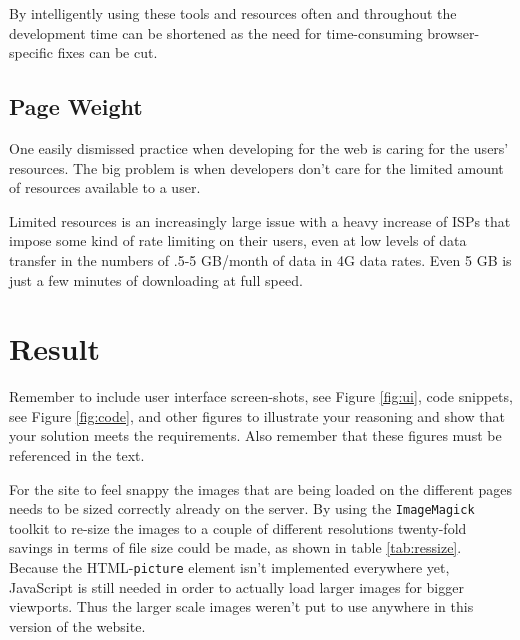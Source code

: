 \documentclass[a4paper]{scrartcl}
\begin{document}
By intelligently using these tools and resources often and throughout the development time can be shortened as the need for time-consuming browser-specific fixes can be cut.

\subsection{Page Weight}
\label{subsec:PageWeight}

One easily dismissed practice when developing for the web is caring for the users' resources. The big problem is when developers don't care for the limited amount of resources available to a user.

Limited resources is an increasingly large issue with a heavy increase of ISPs that impose some kind of rate limiting on their users, even at low levels of data transfer in the numbers of .5-5 GB/month of data in 4G data rates. Even 5 GB is just a few minutes of downloading at full speed.

\section{Result}

Remember to include user interface screen-shots, see Figure \ref{fig:ui}, code snippets, see Figure \ref{fig:code}, and other figures to illustrate your reasoning and show that your solution meets the requirements. Also remember that these figures must be referenced in the text.

For the site to feel snappy the images that are being loaded on the different pages needs to be sized correctly already on the server. By using the \texttt{ImageMagick} toolkit to re-size the images to a couple of different resolutions twenty-fold savings in terms of file size could be made, as shown in table \ref{tab:ressize}. Because the HTML-\texttt{picture} element isn't implemented everywhere yet, JavaScript is still needed in order to actually load larger images for bigger viewports. Thus the larger scale images weren't put to use anywhere in this version of the website.

\end{document}
